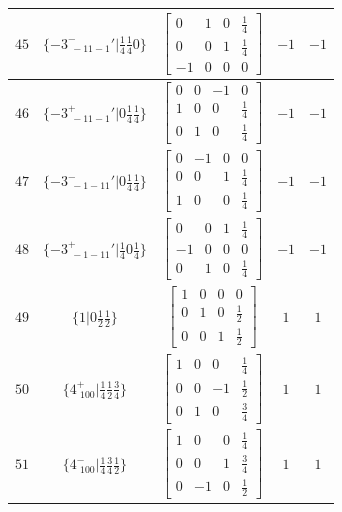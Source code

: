 \documentclass[fleqn,8pt]{jsarticle}
\begin{document}
\begin{longtable}{ccccc}
$ 45 $ & $ \{-3^{-}_{\,\,-11-1}{}'|\frac{1}{4} \frac{1}{4} 0\} $ & $ \begin{bmatrix} 0 & 1 & 0 & \frac{1}{4} \\ 0 & 0 & 1 & \frac{1}{4} \\ -1 & 0 & 0 & 0 \end{bmatrix} $ & $ -1 $ & $ -1 $ \\ \hline
$ 46 $ & $ \{-3^{+}_{\,\,-11-1}{}'|0 \frac{1}{4} \frac{1}{4}\} $ & $ \begin{bmatrix} 0 & 0 & -1 & 0 \\ 1 & 0 & 0 & \frac{1}{4} \\ 0 & 1 & 0 & \frac{1}{4} \end{bmatrix} $ & $ -1 $ & $ -1 $ \\ \hline
$ 47 $ & $ \{-3^{-}_{\,\,-1-11}{}'|0 \frac{1}{4} \frac{1}{4}\} $ & $ \begin{bmatrix} 0 & -1 & 0 & 0 \\ 0 & 0 & 1 & \frac{1}{4} \\ 1 & 0 & 0 & \frac{1}{4} \end{bmatrix} $ & $ -1 $ & $ -1 $ \\ \hline
$ 48 $ & $ \{-3^{+}_{\,\,-1-11}{}'|\frac{1}{4} 0 \frac{1}{4}\} $ & $ \begin{bmatrix} 0 & 0 & 1 & \frac{1}{4} \\ -1 & 0 & 0 & 0 \\ 0 & 1 & 0 & \frac{1}{4} \end{bmatrix} $ & $ -1 $ & $ -1 $ \\ \hline
$ 49 $ & $ \{1|0 \frac{1}{2} \frac{1}{2}\} $ & $ \begin{bmatrix} 1 & 0 & 0 & 0 \\ 0 & 1 & 0 & \frac{1}{2} \\ 0 & 0 & 1 & \frac{1}{2} \end{bmatrix} $ & $ 1 $ & $ 1 $ \\ \hline
$ 50 $ & $ \{4^{+}_{\,\,100}|\frac{1}{4} \frac{1}{2} \frac{3}{4}\} $ & $ \begin{bmatrix} 1 & 0 & 0 & \frac{1}{4} \\ 0 & 0 & -1 & \frac{1}{2} \\ 0 & 1 & 0 & \frac{3}{4} \end{bmatrix} $ & $ 1 $ & $ 1 $ \\ \hline
$ 51 $ & $ \{4^{-}_{\,\,100}|\frac{1}{4} \frac{3}{4} \frac{1}{2}\} $ & $ \begin{bmatrix} 1 & 0 & 0 & \frac{1}{4} \\ 0 & 0 & 1 & \frac{3}{4} \\ 0 & -1 & 0 & \frac{1}{2} \end{bmatrix} $ & $ 1 $ & $ 1 $ \\ \hline

\end{longtable}
\end{document}

